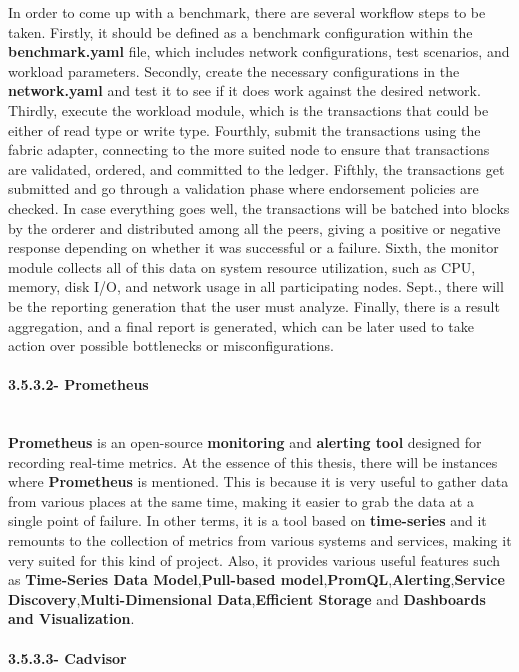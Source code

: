 In order to come up with a benchmark, there are several workflow steps to be taken. Firstly, it should be defined as a benchmark configuration within the \textbf{benchmark.yaml} file, which includes network configurations, test scenarios, and workload parameters. Secondly, create the necessary configurations in the \textbf{network.yaml} and test it to see if it does work against the desired network. Thirdly, execute the workload module, which is the transactions that could be either of read type or write type. Fourthly, submit the transactions using the fabric adapter, connecting to the more suited node to ensure that transactions are validated, ordered, and committed to the ledger. Fifthly, the transactions get submitted and go through a validation phase where endorsement policies are checked. In case everything goes well, the transactions will be batched into blocks by the orderer and distributed among all the peers, giving a positive or negative response depending on whether it was successful or a failure. Sixth, the monitor module collects all of this data on system resource utilization, such as CPU, memory, disk I/O, and network usage in all participating nodes. Sept., there will be the reporting generation that the user must analyze. Finally, there is a result aggregation, and a final report is generated, which can be later used to take action over possible bottlenecks or misconfigurations.

\paragraph{3.5.3.2- Prometheus}\mbox{}\\
\textbf{Prometheus} is an open-source \textbf{monitoring} and \textbf{alerting tool} designed for recording real-time metrics. At the essence of this thesis, there will be instances where \textbf{Prometheus} is mentioned. This is because it is very useful to gather data from various places at the same time, making it easier to grab the data at a single point of failure. In other terms, it is a tool based on \textbf{time-series} and it remounts to the collection of metrics from various systems and services, making it very suited for this kind of project. Also, it provides various useful features such as \textbf{Time-Series Data Model},\textbf{Pull-based model},\textbf{PromQL},\textbf{Alerting},\textbf{Service Discovery},\textbf{Multi-Dimensional Data},\textbf{Efficient Storage} and \textbf{Dashboards and Visualization}.


\paragraph{3.5.3.3- Cadvisor}\mbox{}\\

